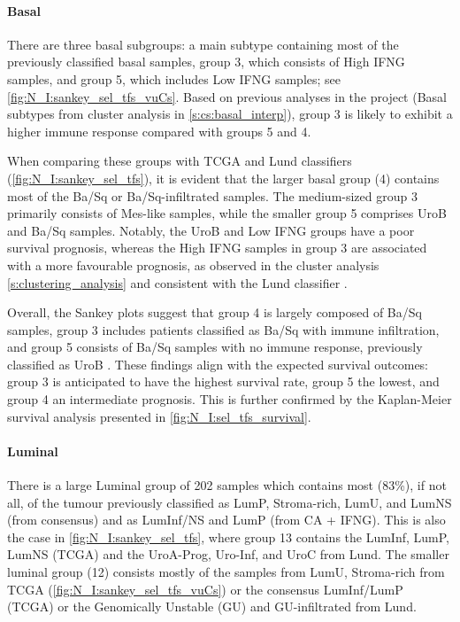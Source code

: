 \paragraph*{Basal}

There are three basal subgroups: a main subtype containing most of the previously classified basal samples, group 3, which consists of High IFNG samples, and group 5, which includes Low IFNG samples; see \cref{fig:N_I:sankey_sel_tfs_vuCs}. Based on previous analyses in the project (Basal subtypes from cluster analysis in \cref{s:cs:basal_interp}), group 3 is likely to exhibit a higher immune response compared with groups 5 and 4.

When comparing these groups with TCGA and Lund classifiers (\cref{fig:N_I:sankey_sel_tfs}), it is evident that the larger basal group (4) contains most of the Ba/Sq or Ba/Sq-infiltrated samples. The medium-sized group 3 primarily consists of Mes-like samples, while the smaller group 5 comprises UroB and Ba/Sq samples. Notably, the UroB and Low IFNG groups have a poor survival prognosis, whereas the High IFNG samples in group 3 are associated with a more favourable prognosis, as observed in the cluster analysis \cref{s:clustering_analysis} and consistent with the Lund classifier \citep{Marzouka2018-ge}.

Overall, the Sankey plots suggest that group 4 is largely composed of Ba/Sq samples, group 3 includes patients classified as Ba/Sq with immune infiltration, and group 5 consists of Ba/Sq samples with no immune response, previously classified as UroB \citep{Marzouka2018-ge}. These findings align with the expected survival outcomes: group 3 is anticipated to have the highest survival rate, group 5 the lowest, and group 4 an intermediate prognosis. This is further confirmed by the Kaplan-Meier survival analysis presented in \cref{fig:N_I:sel_tfs_survival}.

\paragraph*{Luminal}

There is a large Luminal group of 202 samples which contains most (83\%), if not all, of the tumour previously classified as LumP, Stroma-rich, LumU, and LumNS (from consensus) and as LumInf/NS and LumP (from CA + IFNG). This is also the case in \cref{fig:N_I:sankey_sel_tfs}, where group 13 contains the LumInf, LumP, LumNS (TCGA) and the UroA-Prog, Uro-Inf, and UroC from Lund. The smaller luminal group (12) consists mostly of the samples from LumU, Stroma-rich from TCGA (\cref{fig:N_I:sankey_sel_tfs_vuCs}) or the consensus LumInf/LumP (TCGA) or the Genomically Unstable (GU) and GU-infiltrated from Lund.

